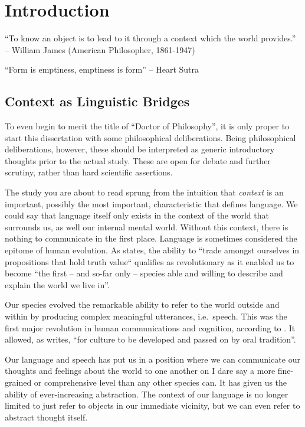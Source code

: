 \chapter{Introduction}
\label{chap:intro}

``To know an object is to lead to it through a context which the world provides.'' -- William James (American Philosopher, 1861-1947)

``Form is emptiness, emptiness is form'' -- Heart Sutra

\section{Context as Linguistic Bridges}


To even begin to merit the title of ``Doctor of Philosophy'', it is only proper to start this dissertation with some
philosophical deliberations. Being philosophical deliberations, however, these should be interpreted as generic
introductory thoughts prior to the actual study. These are open for debate and further scrutiny, rather than hard
scientific assertions.

The study you are about to read sprung from the intuition that \emph{context}
is an important, possibly the most important, characteristic that defines
language. We could say that language itself only exists in the context of the world that
surrounds us, as well our internal mental world. Without this context, there is
nothing to communicate in the first place. Language is sometimes considered the
epitome of human evolution. As \cite{HARNAD91} states, the ability to ``trade amongst ourselves in propositions that hold truth value`` qualifies as revolutionary as it enabled us to become ``the first -- and so-far only -- species able and willing to describe and
explain the world we live in''.

Our species evolved the remarkable ability to refer to the world outside and within by producing complex meaningful
utterances, i.e.\ speech.  This was the first major revolution in human communications and cognition, according to
\cite{HARNAD91}. It allowed, as \cite{HARNAD91} writes, ``for culture to be developed and passed on by oral tradition''.

Our language and speech has put us in a position where we can communicate our thoughts and feelings about the world
to one another on I dare say a more fine-grained or comprehensive level than any other species can. It has given us the
ability of ever-increasing abstraction. The context of our language is no longer limited to just refer to objects in our
immediate vicinity, but we can even refer to abstract thought itself.

